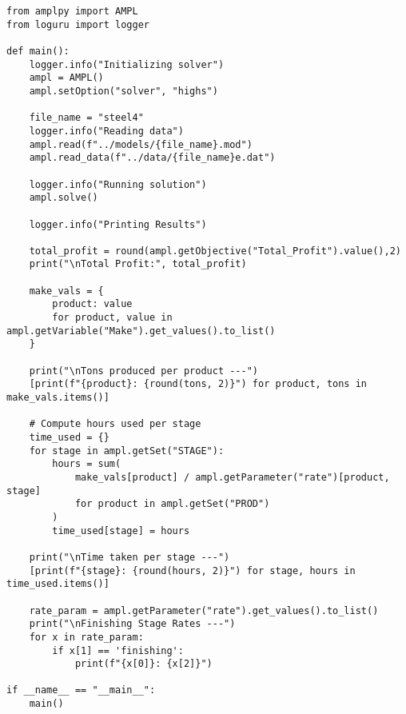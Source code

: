 \begin{verbatim}
from amplpy import AMPL
from loguru import logger

def main():
    logger.info("Initializing solver")
    ampl = AMPL()
    ampl.setOption("solver", "highs")

    file_name = "steel4"
    logger.info("Reading data")
    ampl.read(f"../models/{file_name}.mod")
    ampl.read_data(f"../data/{file_name}e.dat")

    logger.info("Running solution")
    ampl.solve()

    logger.info("Printing Results")

    total_profit = round(ampl.getObjective("Total_Profit").value(),2)
    print("\nTotal Profit:", total_profit)

    make_vals = {
        product: value
        for product, value in ampl.getVariable("Make").get_values().to_list()
    }

    print("\nTons produced per product ---")
    [print(f"{product}: {round(tons, 2)}") for product, tons in make_vals.items()]

    # Compute hours used per stage
    time_used = {}
    for stage in ampl.getSet("STAGE"):
        hours = sum(
            make_vals[product] / ampl.getParameter("rate")[product, stage]
            for product in ampl.getSet("PROD")
        )
        time_used[stage] = hours

    print("\nTime taken per stage ---")
    [print(f"{stage}: {round(hours, 2)}") for stage, hours in time_used.items()]

    rate_param = ampl.getParameter("rate").get_values().to_list()
    print("\nFinishing Stage Rates ---")
    for x in rate_param:
        if x[1] == 'finishing':
            print(f"{x[0]}: {x[2]}")

if __name__ == "__main__":
    main()
\end{verbatim}
